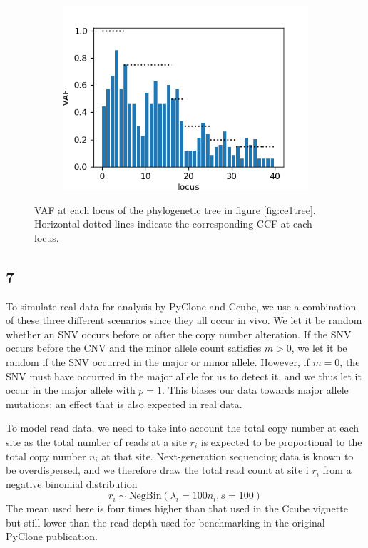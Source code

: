 \documentclass{article}
\begin{document}
\begin{figure}[h]
	\begin{subfigure}[t]{0.30\linewidth}
		\centering
		\includegraphics[width = 1.0\linewidth, trim={0 0 20 20}, clip=true]{major_bylocus.png}
	\end{subfigure}%
\caption{VAF at each locus of the phylogenetic tree in figure \ref{fig:ce1tree}. Horizontal dotted lines indicate the corresponding CCF at each locus.}
\label{fig:bylocus}
\end{figure}

\subsection*{7}

To simulate real data for analysis by PyClone and Ccube, we use a combination of these three different scenarios since they all occur in vivo. We let it be random whether an SNV occurs before or after the copy number alteration. If the SNV occurs before the CNV and the minor allele count satisfies $m > 0$, we let it be random if the SNV occurred in the major or minor allele. However, if $m = 0$, the SNV must have occurred in the major allele for us to detect it, and we thus let it occur in the major allele with $p=1$. This biases our data towards major allele mutations; an effect that is also expected in real data.

To model read data, we need to take into account the total copy number at each site as the total number of reads at a site $r_i$ is expected to be proportional to the total copy number $n_i$ at that site. Next-generation sequencing data is known to be overdispersed, and we therefore draw the total read count at site i $r_i$ from a negative binomial distribution
\begin{equation}
r_i \sim \text{NegBin}(\lambda_i = 100n_i, s=100) 
\end{equation}
The mean used here is four times higher than that used in the Ccube vignette but still lower than the read-depth used for benchmarking in the original PyClone publication.
\end{document}
